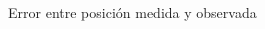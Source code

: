\documentclass[a4paper, 10pt, onecolumn,journal]{ieeeconf}
\begin{document}
\begin{figure}[H]
	\centering
	\begin{adjustbox}{max width=\columnwidth}
	\end{adjustbox}
	\caption{Error entre posición medida y observada}
	\label{Error entre posición medida y observada}
\end{figure}
\end{document}
